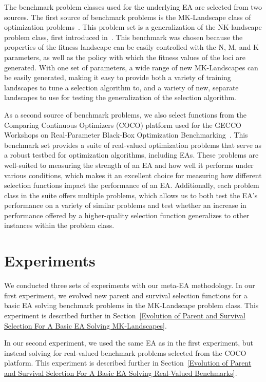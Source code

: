 \documentclass[sigconf]{acmart}
\begin{document}
The benchmark problem classes used for the underlying EA are selected from two sources. The first source of benchmark problems is the MK-Landscape class of optimization problems~\citep{whitley2016gray}. This problem set is a generalization of the NK-landscape problem class, first introduced in~\citep{kaufmann1993origins}. This benchmark was chosen because the properties of the fitness landscape can be easily controlled with the N, M, and K parameters, as well as the policy with which the fitness values of the loci are generated. With one set of parameters, a wide range of new MK-Landscapes can be easily generated, making it easy to provide both a variety of training landscapes to tune a selection algorithm to, and a variety of new, separate landscapes to use for testing the generalization of the selection algorithm. 

As a second source of benchmark problems, we also select functions from the Comparing Continuous Optimizers (COCO) platform used for the GECCO Workshops on Real-Parameter Black-Box Optimization Benchmarking~\citep{cocobbob}. This benchmark set provides a suite of real-valued optimization problems that serve as a robust testbed for optimization algorithms, including EAs. These problems are well-suited to measuring the strength of an EA and how well it performs under various conditions, which makes it an excellent choice for measuring how different selection functions impact the performance of an EA. Additionally, each problem class in the suite offers multiple problems, which allows us to both test the EA's performance on a variety of similar problems and test whether an increase in performance offered by a higher-quality selection function generalizes to other instances within the problem class.

\section{Experiments}
\label{Primary Experiments}

We conducted three sets of experiments with our meta-EA methodology. In our first experiment, we evolved new parent and survival selection functions for a basic EA solving benchmark problems in the MK-Landscape problem class. This experiment is described further in Section~\ref{Evolution of Parent and Survival Selection For A Basic EA Solving MK-Landscapes}.

In our second experiment, we used the same EA as in the first experiment, but instead solving for real-valued benchmark problems selected from the COCO platform. This experiment is described further in Section~\ref{Evolution of Parent and Survival Selection For A Basic EA Solving Real-Valued Benchmarks}.
\end{document}
